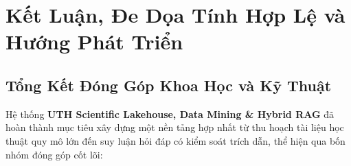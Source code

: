 
\chapter{Kết Luận, Đe Dọa Tính Hợp Lệ và Hướng Phát Triển}
\label{chap:conclusion}

\section{Tổng Kết Đóng Góp Khoa Học và Kỹ Thuật}
\label{sec:ch7_contributions}

Hệ thống \textbf{UTH Scientific Lakehouse, Data Mining \& Hybrid RAG} đã hoàn thành mục tiêu xây dựng một nền tảng hợp nhất từ thu hoạch tài liệu học thuật quy mô lớn đến suy luận hỏi đáp có kiểm soát trích dẫn, thể hiện qua bốn nhóm đóng góp cốt lõi:

